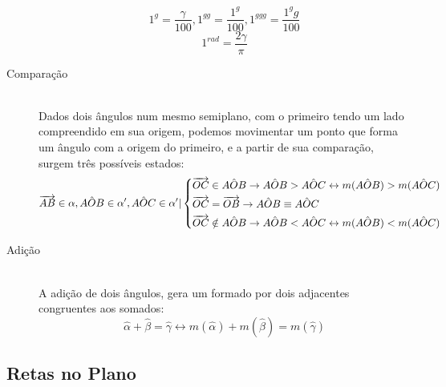 \begin{description}
                \[ 1^g = \frac{\gamma}{100}, 1^{gg} = \frac{1^g}{100}, 1^{ggg} = \frac{1^gg}{100} \]
                \[ 1^{rad} = \frac{2\gamma}{\pi} \]
            \item[Comparação] \hfill \\
                Dados dois ângulos num mesmo semiplano, com o primeiro tendo um lado compreendido em sua origem, podemos movimentar um ponto que forma um ângulo com a origem do primeiro, e a partir de sua comparação, surgem três possíveis estados:
                \[ \overrightarrow{AB} \in \alpha , \hat{AOB} \in \alpha' , \hat{AOC} \in \alpha' | \begin{dcases} \overrightarrow{OC} \in \hat{AOB} \rightarrow \hat{AOB} > \hat{AOC} \leftrightarrow m(\hat{AOB}) > m(\hat{AOC}) \\ \overrightarrow{OC} = \overrightarrow{OB} \rightarrow \hat{AOB} \equiv \hat{AOC} \\ \overrightarrow{OC} \notin \hat{AOB} \rightarrow \hat{AOB} < \hat{AOC} \leftrightarrow m(\hat{AOB}) < m(\hat{AOC})  \end{dcases} \]
            \item[Adição] \hfill \\
                A adição de dois ângulos, gera um formado por dois adjacentes congruentes aos somados:
                \[ \hat{\alpha} + \hat{\beta} = \hat{\gamma} \leftrightarrow m(\hat{\alpha}) + m(\hat{\beta}) = m(\hat{\gamma}) \]
        \end{description}
\subsection{Retas no Plano}
